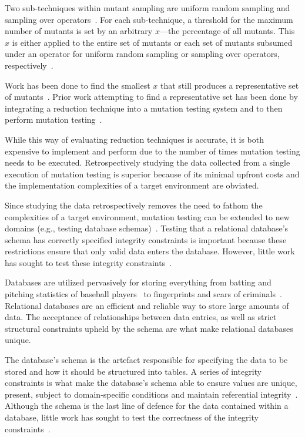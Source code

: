 Two sub-techniques within mutant sampling are uniform random sampling and sampling over
operators~\cite{gopinath2015mutation, gopinath2015empirical}.  For each sub-technique, a threshold for the maximum
number of mutants is set by an arbitrary $x$---the percentage of all mutants.  This $x$ is either applied to the entire
set of mutants or each set of mutants subsumed under an operator for uniform random sampling or sampling over operators,
respectively~\cite{gopinath2015mutation, gopinath2015empirical}.

Work has been done to find the smallest $x$ that still produces
a representative set of mutants~\cite{jia2011analysis, mathur1994empirical}. Prior work
attempting to find a representative set has been done by integrating a reduction technique into
a mutation testing system and to then perform mutation testing~\cite{demillo1988extended, king1991fortran}.

While this way of evaluating reduction techniques is accurate, it is both
expensive to implement and perform due to the number of times mutation testing
needs to be executed. Retrospectively studying the data
collected from a single execution of mutation testing is superior
because of its minimal upfront costs and the implementation complexities of
a target environment are obviated.

Since studying the data retrospectively removes the need to fathom the complexities of a target environment,
mutation testing can be extended to new domains (e.g., testing database schemas)~\cite{mcminn2016virtual, mcminn2015effectiveness, wright2013efficient}.
Testing that a relational database's schema has correctly specified integrity constraints is important
because these restrictions ensure that only valid data enters the database. However, little work has
sought to test these integrity constraints~\cite{mcminn2016virtual}.

Databases are utilized pervasively for storing everything from batting and pitching statistics of baseball
players~\cite{lahmanbaseball} to fingerprints and scars of criminals~\cite{ngi}.
Relational databases are an efficient and reliable way to store large amounts of data.
The acceptance of relationships between data entries, as well as strict structural constraints
upheld by the schema are what make relational databases unique.

The database's schema is the artefact responsible for specifying the data to be stored and
how it should be structured into tables. A series of integrity constraints
is what make the database's schema able to ensure values are unique, present,
subject to domain-specific conditions and maintain referential integrity~\cite{mcminn2016virtual}.
Although the schema is the last line of defence for the data contained
within a database, little work has sought to test the correctness of the integrity constraints~\cite{mcminn2015effectiveness}.

